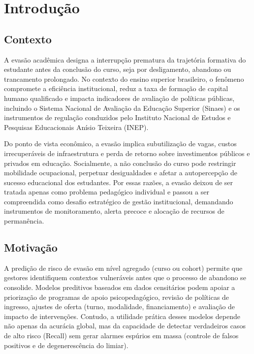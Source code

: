 \documentclass[conference]{IEEEtran}
\begin{document}
\section{Introdução}

\subsection{Contexto}
A evasão acadêmica designa a interrupção prematura da trajetória formativa do estudante antes da conclusão do curso, seja por desligamento, abandono ou trancamento prolongado. No contexto do ensino superior brasileiro, o fenômeno compromete a eficiência institucional, reduz a taxa de formação de capital humano qualificado e impacta indicadores de avaliação de políticas públicas, incluindo o Sistema Nacional de Avaliação da Educação Superior (Sinaes) e os instrumentos de regulação conduzidos pelo Instituto Nacional de Estudos e Pesquisas Educacionais Anísio Teixeira (INEP).

Do ponto de vista econômico, a evasão implica subutilização de vagas, custos irrecuperáveis de infraestrutura e perda de retorno sobre investimentos públicos e privados em educação. Socialmente, a não conclusão do curso pode restringir mobilidade ocupacional, perpetuar desigualdades e afetar a autopercepção de sucesso educacional dos estudantes. Por essas razões, a evasão deixou de ser tratada apenas como problema pedagógico individual e passou a ser compreendida como desafio estratégico de gestão institucional, demandando instrumentos de monitoramento, alerta precoce e alocação de recursos de permanência.

\subsection{Motivação}
A predição de risco de evasão em nível agregado (curso ou cohort) permite que gestores identifiquem contextos vulneráveis antes que o processo de abandono se consolide. Modelos preditivos baseados em dados censitários podem apoiar a priorização de programas de apoio psicopedagógico, revisão de políticas de ingresso, ajustes de oferta (turno, modalidade, financiamento) e avaliação de impacto de intervenções. Contudo, a utilidade prática desses modelos depende não apenas da acurácia global, mas da capacidade de detectar verdadeiros casos de alto risco (Recall) sem gerar alarmes espúrios em massa (controle de falsos positivos e de degenerescência do limiar).
\end{document}
